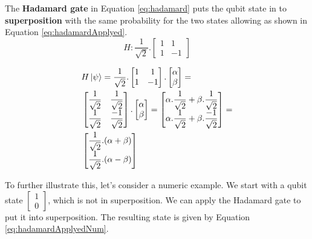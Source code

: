 		
			\par The \textbf{Hadamard gate} in Equation \ref{eq:hadamard} puts the qubit state in to \textbf{superposition} \cite{qcfcs}  with the same probability for the two states \cite{da2018introduccao} allowing as shown in Equation \ref{eq:hadamardApplyed}.
			\begin{equation}
				\label{eq:hadamard}
				H : \dfrac{1}{\sqrt{2}}.
				\begin{bmatrix}
					1& 1 \\
					1& -1
				\end{bmatrix}
			\end{equation}
			
			\begin{equation}
				\label{eq:hadamardApplyed}
				\begin{aligned}
					&H\ket{\psi} = \dfrac{1}{\sqrt{2}}.\begin{bmatrix}
						1& 1 \\
						1& -1
					\end{bmatrix} . \begin{bmatrix}
						\alpha \\
						\beta
					\end{bmatrix} = \\
					&\begin{bmatrix}
						\dfrac{1}{\sqrt{2}} &\dfrac{1}{\sqrt{2}} \\
						\dfrac{1}{\sqrt{2}} &\dfrac{-1}{\sqrt{2}}
					\end{bmatrix} .
					\begin{bmatrix}
						\alpha \\
						\beta
					\end{bmatrix} = 
					\begin{bmatrix}
						\alpha . \dfrac{1}{\sqrt{2}} + \beta.\dfrac{1}{\sqrt{2}} \\
						\alpha . \dfrac{1}{\sqrt{2}} + \beta.\dfrac{-1}{\sqrt{2}}
					\end{bmatrix} = \\
					&\begin{bmatrix}
						\dfrac{1}{\sqrt{2}} . (\alpha + \beta) \\
						\dfrac{1}{\sqrt{2}} . (\alpha - \beta)
					\end{bmatrix}
				\end{aligned}
			\end{equation}
		
			\par To further illustrate this, let's consider a numeric example. We start with a qubit state $\begin{bmatrix} 1 \\ 0 \end{bmatrix}$, which is not in superposition. We can apply the Hadamard gate to put it into superposition. The resulting state is given by Equation \ref{eq:hadamardApplyedNum}.
			
